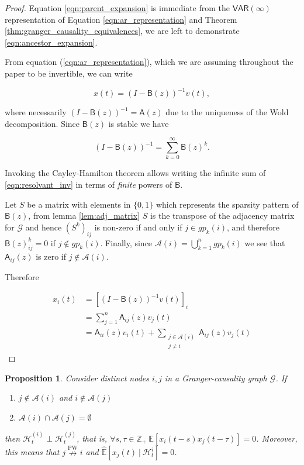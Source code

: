 \documentclass{statsoc}
\def\npwgc{\overset{\text{PW}}{\nrightarrow}}  %
\def\gcg{\mathcal{G}}  %
\def\VAR{\mathsf{VAR}}  %
\def\B{\mathsf{B}}  %
\def\A{\mathsf{A}}  %
\def\H{\mathcal{H}}  %
\newcommand{\linE}[2]{\hat{\E}[#1\ |\ #2]}  %
\newcommand{\anc}[1]{\mathcal{A}(#1)}  %
\newcommand{\gpn}[2]{gp_{#1}(#2)}  %
\newtheorem{proposition}{Proposition}
\def\H{\mathcal{H}}  %
\def\E{\mathbb{E}}  %
\def\Z{\mathbb{Z}}  %
\begin{document}
\begin{proof}
  Equation \eqref{eqn:parent_expansion} is immediate from the
  $\VAR(\infty)$ representation of Equation \eqref{eqn:ar_representation}
  and Theorem \ref{thm:granger_causality_equivalences}, we are left to
  demonstrate \eqref{eqn:ancestor_expansion}.
  
  From equation (\ref{eqn:ar_representation}), which we are assuming
  throughout the paper to be invertible, we can write

  \begin{equation*}
    x(t) = (I - \B(z))^{-1} v(t),
  \end{equation*}

  where necessarily $(I - \B(z))^{-1} = \A(z)$ due to the uniqueness
  of the Wold decomposition.  Since $\B(z)$ is stable we have

  \begin{equation}
    \label{eqn:resolvant_inv}
    (I - \B(z))^{-1} = \sum_{k = 0}^\infty \B(z)^k.
  \end{equation}

  Invoking the Cayley-Hamilton theorem allows writing the infinite sum
  of \eqref{eqn:resolvant_inv} in terms of \textit{finite} powers of
  $\B$.

  Let $S$ be a matrix with elements in $\{0, 1\}$ which represents the
  sparsity pattern of $\B(z)$, from lemma \ref{lem:adj_matrix} $S$ is
  the transpose of the adjacency matrix for $\gcg$ and hence
  $(S^k)_{ij}$ is non-zero if and only if $j \in \gpn{k}{i}$, and
  therefore $\B(z)^k_{ij} = 0$ if $j \not \in \gpn{k}{i}$.  Finally,
  since $\anc{i} = \bigcup_{k = 1}^n\gpn{k}{i}$ we see that
  $\A_{ij}(z)$ is zero if $j \not\in \anc{i}$.

  Therefore

  \begin{align*}
    x_i(t) &= [(I - \B(z))^{-1}v(t)]_i\\
           &= \sum_{j = 1}^n \A_{ij}(z) v_j(t)\\
           &= \A_{ii}(z) v_i(t) + \sum_{\substack{j \in \anc{i} \\ j \ne i}} \A_{ij}(z) v_j(t)
  \end{align*}
\end{proof}

\begin{proposition}
  \label{prop:separated_ancestor_uncorrelated}
  Consider distinct nodes $i, j$ in a Granger-causality graph
  $\gcg$.  If

  \begin{enumerate}[label=(\alph*)]
  \item{$j \not\in \anc{i}$ and $i \not\in \anc{j}$}
  \item{$\anc{i}\cap\anc{j} = \emptyset$}
  \end{enumerate}

  then $\H_t^{(i)} \perp \H_t^{(j)}$, that is,
  $\forall s, \tau \in \Z_+\ \E[x_i(t - s)x_j(t - \tau)] = 0$.  Moreover,
  this means that $j \npwgc i$ and $\linE{x_j(t)}{\H_t^i} = 0$.
\end{proposition}
\end{document}
